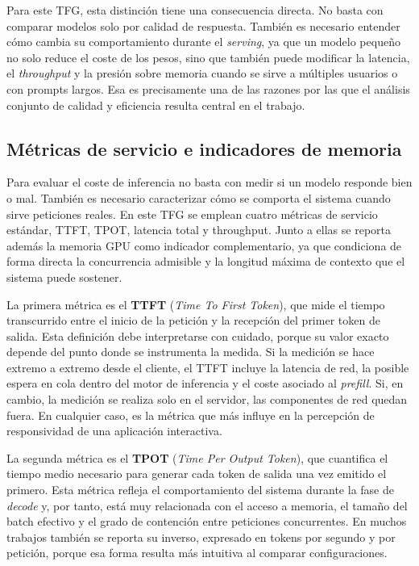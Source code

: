 Para este TFG, esta distinción tiene una consecuencia directa. No basta con comparar modelos solo por calidad de respuesta. También es necesario entender cómo cambia su comportamiento durante el \textit{serving}, ya que un modelo pequeño no solo reduce el coste de los pesos, sino que también puede modificar la latencia, el \textit{throughput} y la presión sobre memoria cuando se sirve a múltiples usuarios o con prompts largos. Esa es precisamente una de las razones por las que el análisis conjunto de calidad y eficiencia resulta central en el trabajo.

\subsection{Métricas de servicio e indicadores de memoria}

Para evaluar el coste de inferencia no basta con medir si un modelo responde bien o mal. También es necesario caracterizar cómo se comporta el sistema cuando sirve peticiones reales. En este TFG se emplean cuatro métricas de servicio estándar, TTFT, TPOT, latencia total y throughput. Junto a ellas se reporta además la memoria GPU como indicador complementario, ya que condiciona de forma directa la concurrencia admisible y la longitud máxima de contexto que el sistema puede sostener.

La primera métrica es el \textbf{TTFT} (\textit{Time To First Token}), que mide el tiempo transcurrido entre el inicio de la petición y la recepción del primer token de salida. Esta definición debe interpretarse con cuidado, porque su valor exacto depende del punto donde se instrumenta la medida. Si la medición se hace extremo a extremo desde el cliente, el TTFT incluye la latencia de red, la posible espera en cola dentro del motor de inferencia y el coste asociado al \textit{prefill}. Si, en cambio, la medición se realiza solo en el servidor, las componentes de red quedan fuera. En cualquier caso, es la métrica que más influye en la percepción de responsividad de una aplicación interactiva.

La segunda métrica es el \textbf{TPOT} (\textit{Time Per Output Token}), que cuantifica el tiempo medio necesario para generar cada token de salida una vez emitido el primero. Esta métrica refleja el comportamiento del sistema durante la fase de \textit{decode} y, por tanto, está muy relacionada con el acceso a memoria, el tamaño del batch efectivo y el grado de contención entre peticiones concurrentes. En muchos trabajos también se reporta su inverso, expresado en tokens por segundo y por petición, porque esa forma resulta más intuitiva al comparar configuraciones.


